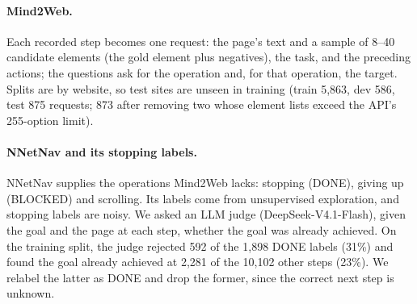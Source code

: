\documentclass[11pt]{article}
\begin{document}
\begin{table}[t]
\centering\small
{}
\caption{Training mixture (rows after conversion; weight = repetitions per epoch). $^\dagger$wev-4b only.}
\label{tab:data}
\end{table}

\paragraph{Mind2Web.} Each recorded step becomes one request: the page's text and a sample of 8--40 candidate elements
(the gold element plus negatives), the task, and the preceding actions; the questions ask for the operation and, for
that operation, the target. Splits are by website, so test sites are unseen in training (train 5{,}863, dev 586, test
875 requests; 873 after removing two whose element lists exceed the API's 255-option limit).

\paragraph{NNetNav and its stopping labels.} NNetNav supplies the operations Mind2Web lacks: stopping (DONE), giving up
(BLOCKED) and scrolling. Its labels come from unsupervised exploration, and stopping labels are noisy. We asked an LLM
judge (DeepSeek-V4.1-Flash), given the goal and the page at each step, whether the goal was already achieved. On the
training split, the judge rejected 592 of the 1{,}898 DONE labels (31\%) and found the goal already achieved at 2{,}281
of the 10{,}102 other steps (23\%). We relabel the latter as DONE and drop the former, since the correct next step is
unknown.
\end{document}
